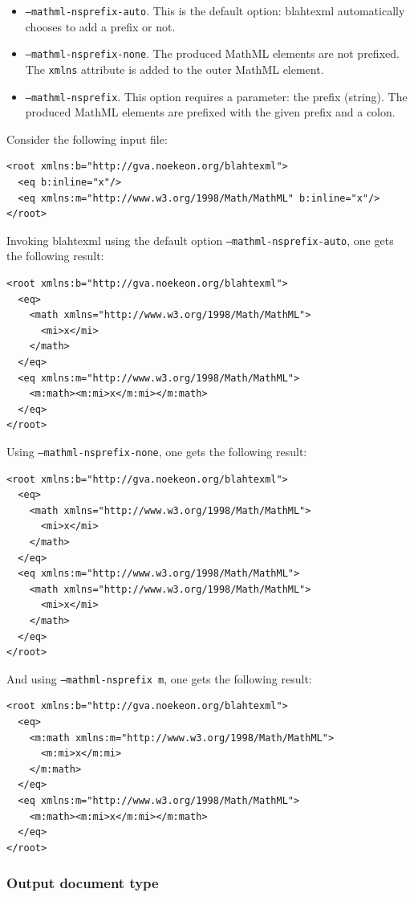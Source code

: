 \documentclass{article}
\begin{document}
\begin{itemize}
\item \texttt{--mathml-nsprefix-auto}. This is the default option: blahtexml automatically chooses to add a prefix or not.
\item \texttt{--mathml-nsprefix-none}. The produced MathML elements are not prefixed. The \texttt{xmlns} attribute is added to the outer MathML element.
\item \texttt{--mathml-nsprefix}. This option requires a parameter: the prefix (string). The produced MathML elements are prefixed with the given prefix and a colon.
\end{itemize}

Consider the following input file:
\begin{verbatim}
<root xmlns:b="http://gva.noekeon.org/blahtexml">
  <eq b:inline="x"/>
  <eq xmlns:m="http://www.w3.org/1998/Math/MathML" b:inline="x"/>
</root>
\end{verbatim}

Invoking blahtexml using the default option \texttt{--mathml-nsprefix-auto}, one gets the following result:
\begin{verbatim}
<root xmlns:b="http://gva.noekeon.org/blahtexml">
  <eq>
    <math xmlns="http://www.w3.org/1998/Math/MathML">
      <mi>x</mi>
    </math>
  </eq>
  <eq xmlns:m="http://www.w3.org/1998/Math/MathML">
    <m:math><m:mi>x</m:mi></m:math>
  </eq>
</root>
\end{verbatim}

Using \texttt{--mathml-nsprefix-none}, one gets the following result:
\begin{verbatim}
<root xmlns:b="http://gva.noekeon.org/blahtexml">
  <eq>
    <math xmlns="http://www.w3.org/1998/Math/MathML">
      <mi>x</mi>
    </math>
  </eq>
  <eq xmlns:m="http://www.w3.org/1998/Math/MathML">
    <math xmlns="http://www.w3.org/1998/Math/MathML">
      <mi>x</mi>
    </math>
  </eq>
</root>
\end{verbatim}

And using \texttt{--mathml-nsprefix m}, one gets the following result:
\begin{verbatim}
<root xmlns:b="http://gva.noekeon.org/blahtexml">
  <eq>
    <m:math xmlns:m="http://www.w3.org/1998/Math/MathML">
      <m:mi>x</m:mi>
    </m:math>
  </eq>
  <eq xmlns:m="http://www.w3.org/1998/Math/MathML">
    <m:math><m:mi>x</m:mi></m:math>
  </eq>
</root>
\end{verbatim}


\subsubsection{Output document type}
\end{document}
